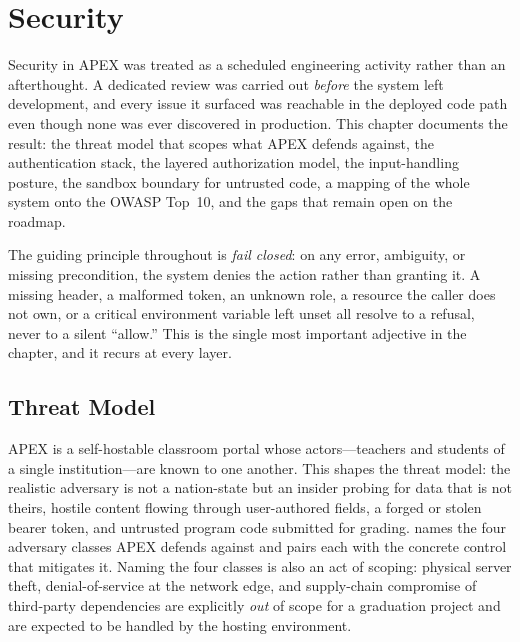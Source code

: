 \chapter{Security}\label{ch:ch08}

Security in APEX was treated as a scheduled engineering activity rather than an
afterthought. A dedicated review was carried out \emph{before} the system left
development, and every issue it surfaced was reachable in the deployed code path
even though none was ever discovered in production. This chapter documents the
result: the threat model that scopes what APEX defends against, the
authentication stack, the layered authorization model, the input-handling
posture, the sandbox boundary for untrusted code, a mapping of the whole system
onto the OWASP Top~10, and the gaps that remain open on the roadmap.

The guiding principle throughout is \emph{fail closed}: on any error,
ambiguity, or missing precondition, the system denies the action rather than
granting it. A missing header, a malformed token, an unknown role, a resource
the caller does not own, or a critical environment variable left unset all
resolve to a refusal, never to a silent ``allow.'' This is the single most
important adjective in the chapter, and it recurs at every layer.

\section{Threat Model}
\label{sec:threat-model}

APEX is a self-hostable classroom portal whose actors---teachers and students
of a single institution---are known to one another. This shapes the threat
model: the realistic adversary is not a nation-state but an insider probing for
data that is not theirs, hostile content flowing through user-authored fields,
a forged or stolen bearer token, and untrusted program code submitted for
grading.  names the four adversary classes APEX defends
against and pairs each with the concrete control that mitigates it. Naming the
four classes is also an act of scoping: physical server theft, denial-of-service
at the network edge, and supply-chain compromise of third-party dependencies are
explicitly \emph{out} of scope for a graduation project and are expected to be
handled by the hosting environment.



